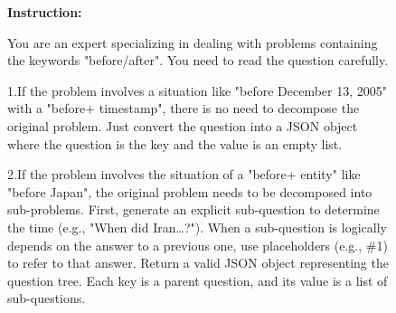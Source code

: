 \documentclass[11pt]{article}
\begin{document}
\begin{figure}[!h]
\begin{tcolorbox}[
    colback=black!10, 
    colframe=black!70, 
    boxrule=1pt, 
    arc=5mm, 
    boxsep=2mm, 
    left=5mm, 
    right=5mm, 
    top=5mm, 
    bottom=4mm,
    width=\textwidth, %
    nobeforeafter, %
    colupper=black %
]
{\small\sffamily %
\textbf{Instruction:} 

You are an expert specializing in dealing with problems containing the keywords "before/after". You need to read the question carefully. 

1.If the problem involves a situation like "before December 13, 2005" with a "before+ timestamp", there is no need to decompose the original problem. Just convert the question into a JSON object where the question is the key and the value is an empty list. 

2.If the problem involves the situation of a "before+ entity" like "before Japan", the original problem needs to be decomposed into sub-problems. First, generate an explicit sub-question to determine the time (e.g., "When did Iran…?"). When a sub-question is logically depends on the answer to a previous one, use placeholders (e.g., \#1) to refer to that answer. Return a valid JSON object representing the question tree. Each key is a parent question, and its value is a list of sub-questions.

}
\end{tcolorbox}
\end{figure}
\end{document}
